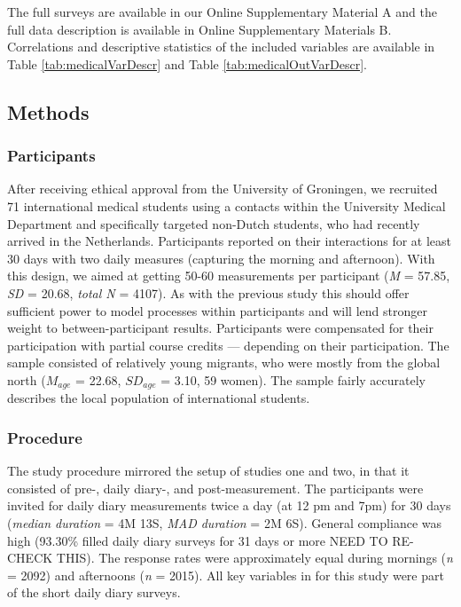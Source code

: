 The full surveys are available in our Online Supplementary Material A
and the full data description is available in Online Supplementary
Materials B. Correlations and descriptive statistics of the included
variables are available in Table \ref{tab:medicalVarDescr} and Table
\ref{tab:medicalOutVarDescr}.

\subsection{Methods}

\subsubsection{Participants}

After receiving ethical approval from the University of Groningen, we
recruited 71 international medical students using a contacts within the
University Medical Department and specifically targeted non-Dutch
students, who had recently arrived in the Netherlands. Participants
reported on their interactions for at least 30 days with two daily
measures (capturing the morning and afternoon). With this design, we
aimed at getting 50-60 measurements per participant (\textit{M} = 57.85,
\textit{SD} = 20.68, \textit{total N} = 4107). As with the previous
study this should offer sufficient power to model processes within
participants and will lend stronger weight to between-participant
results. Participants were compensated for their participation with
partial course credits --- depending on their participation. The sample
consisted of relatively young migrants, who were mostly from the global
north (\(M_{age}\) = 22.68, \(SD_{age}\) = 3.10, 59 women). The sample
fairly accurately describes the local population of international
students.

\subsubsection{Procedure}

The study procedure mirrored the setup of studies one and two, in that
it consisted of pre-, daily diary-, and post-measurement. The
participants were invited for daily diary measurements twice a day (at
12 pm and 7pm) for 30 days (\textit{median duration} = 4M 13S,
\textit{MAD duration} = 2M 6S). General compliance was high (93.30\%
filled daily diary surveys for 31 days or more NEED TO RE-CHECK THIS).
The response rates were approximately equal during mornings (\textit{n}
= 2092) and afternoons (\textit{n} = 2015). All key variables in for
this study were part of the short daily diary surveys.

